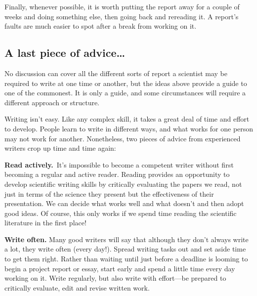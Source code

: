 \documentclass[
]{book}
\begin{document}
Finally, whenever possible, it is worth putting the report away for a couple of weeks and doing something else, then going back and rereading it. A report's faults are much easier to spot after a break from working on it.

\hypertarget{a-last-piece-of-advice}{%
\subsection{A last piece of advice\ldots{}}\label{a-last-piece-of-advice}}

No discussion can cover all the different sorts of report a scientist may be required to write at one time or another, but the ideas above provide a guide to one of the commonest. It is only a guide, and some circumstances will require a different approach or structure.

Writing isn't easy. Like any complex skill, it takes a great deal of time and effort to develop. People learn to write in different ways, and what works for one person may not work for another. Nonetheless, two pieces of advice from experienced writers crop up time and time again:

\textbf{Read actively.}~It's impossible to become a competent writer without first becoming a regular and active reader. Reading provides an opportunity to develop scientific writing skills by critically evaluating the papers we read, not just in terms of the science they present but the effectiveness of their presentation. We can decide what works well and what doesn't and then adopt good ideas. Of course, this only works if we spend time reading the scientific literature in the first place!

\textbf{Write often.} Many good writers will say that although they don't always write a lot, they write often (every day!). Spread writing tasks out and set aside time to get them right. Rather than waiting until just before a deadline is looming to begin a project report or essay, start early and spend a little time every day working on it. Write regularly, but also write with effort---be prepared to critically evaluate, edit and revise written work.

  
\end{document}
